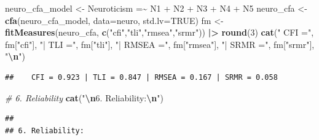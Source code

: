 \documentclass[
]{article}
\newenvironment{Shaded}{\begin{snugshade}}{\end{snugshade}}
\newcommand{\AttributeTok}[1]{\textcolor[rgb]{0.13,0.29,0.53}{#1}}
\newcommand{\CommentTok}[1]{\textcolor[rgb]{0.56,0.35,0.01}{\textit{#1}}}
\newcommand{\ConstantTok}[1]{\textcolor[rgb]{0.56,0.35,0.01}{#1}}
\newcommand{\DecValTok}[1]{\textcolor[rgb]{0.00,0.00,0.81}{#1}}
\newcommand{\FunctionTok}[1]{\textcolor[rgb]{0.13,0.29,0.53}{\textbf{#1}}}
\newcommand{\NormalTok}[1]{#1}
\newcommand{\OtherTok}[1]{\textcolor[rgb]{0.56,0.35,0.01}{#1}}
\newcommand{\SpecialCharTok}[1]{\textcolor[rgb]{0.81,0.36,0.00}{\textbf{#1}}}
\newcommand{\StringTok}[1]{\textcolor[rgb]{0.31,0.60,0.02}{#1}}
\begin{document}
\begin{Shaded}
\begin{Highlighting}[]
\NormalTok{neuro\_cfa\_model }\OtherTok{\textless{}{-}} \StringTok{\textquotesingle{}Neuroticism =\textasciitilde{} N1 + N2 + N3 + N4 + N5\textquotesingle{}}
\NormalTok{neuro\_cfa }\OtherTok{\textless{}{-}} \FunctionTok{cfa}\NormalTok{(neuro\_cfa\_model, }\AttributeTok{data=}\NormalTok{neuro, }\AttributeTok{std.lv=}\ConstantTok{TRUE}\NormalTok{)}
\NormalTok{fm }\OtherTok{\textless{}{-}} \FunctionTok{fitMeasures}\NormalTok{(neuro\_cfa, }\FunctionTok{c}\NormalTok{(}\StringTok{"cfi"}\NormalTok{,}\StringTok{"tli"}\NormalTok{,}\StringTok{"rmsea"}\NormalTok{,}\StringTok{"srmr"}\NormalTok{)) }\SpecialCharTok{|\textgreater{}} \FunctionTok{round}\NormalTok{(}\DecValTok{3}\NormalTok{)}
\FunctionTok{cat}\NormalTok{(}\StringTok{"   CFI ="}\NormalTok{, fm[}\StringTok{"cfi"}\NormalTok{], }\StringTok{"| TLI ="}\NormalTok{, fm[}\StringTok{"tli"}\NormalTok{],}
    \StringTok{"| RMSEA ="}\NormalTok{, fm[}\StringTok{"rmsea"}\NormalTok{], }\StringTok{"| SRMR ="}\NormalTok{, fm[}\StringTok{"srmr"}\NormalTok{], }\StringTok{"}\SpecialCharTok{\textbackslash{}n}\StringTok{"}\NormalTok{)}
\end{Highlighting}
\end{Shaded}

\begin{verbatim}
##    CFI = 0.923 | TLI = 0.847 | RMSEA = 0.167 | SRMR = 0.058
\end{verbatim}

\begin{Shaded}
\begin{Highlighting}[]
\CommentTok{\# 6. Reliability}
\FunctionTok{cat}\NormalTok{(}\StringTok{"}\SpecialCharTok{\textbackslash{}n}\StringTok{6. Reliability:}\SpecialCharTok{\textbackslash{}n}\StringTok{"}\NormalTok{)}
\end{Highlighting}
\end{Shaded}

\begin{verbatim}
## 
## 6. Reliability:
\end{verbatim}

\begin{Shaded}
\end{Shaded}
\end{document}
